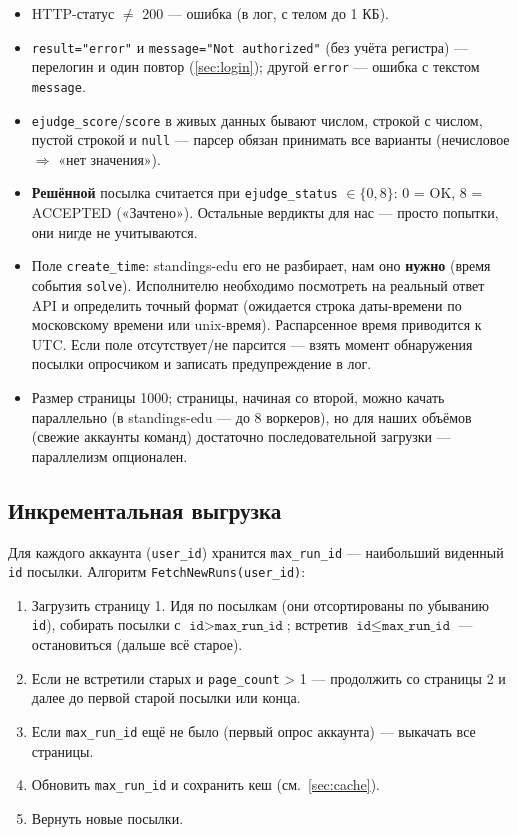 \documentclass[12pt,a4paper]{article}
\newcommand{\field}[1]{\texttt{#1}}
\begin{document}
\begin{itemize}[nosep]
  \item HTTP-статус $\ne$ 200 --- ошибка (в лог, с телом до 1 КБ).
  \item \field{result="error"} и \field{message="Not authorized"}
        (без учёта регистра) --- перелогин и один повтор
        (\ref{sec:login}); другой \field{error} --- ошибка с текстом
        \field{message}.
  \item \field{ejudge\_score}/\field{score} в живых данных бывают числом,
        строкой с числом, пустой строкой и \field{null} --- парсер обязан
        принимать все варианты (нечисловое $\Rightarrow$ «нет значения»).
  \item \textbf{Решённой} посылка считается при
        \field{ejudge\_status} $\in \{0, 8\}$: $0$ = OK, $8$ = ACCEPTED
        («Зачтено»). Остальные вердикты для нас --- просто попытки, они
        нигде не учитываются.
  \item Поле \field{create\_time}: standings-edu его не разбирает, нам оно
        \textbf{нужно} (время события \field{solve}). Исполнителю
        необходимо посмотреть на реальный ответ API и определить точный
        формат (ожидается строка даты-времени по московскому времени или
        unix-время). Распарсенное время приводится к UTC. Если поле
        отсутствует/не парсится --- взять момент обнаружения посылки
        опросчиком и записать предупреждение в лог.
  \item Размер страницы 1000; страницы, начиная со второй, можно качать
        параллельно (в standings-edu --- до 8 воркеров), но для наших
        объёмов (свежие аккаунты команд) достаточно последовательной
        загрузки --- параллелизм опционален.
\end{itemize}

\subsection{Инкрементальная выгрузка}

Для каждого аккаунта (\field{user\_id}) хранится \field{max\_run\_id} ---
наибольший виденный \field{id} посылки. Алгоритм
\field{FetchNewRuns(user\_id)}:

\begin{enumerate}[nosep]
  \item Загрузить страницу 1. Идя по посылкам (они отсортированы по убыванию
        \field{id}), собирать посылки с $\field{id} > \field{max\_run\_id}$;
        встретив $\field{id} \le \field{max\_run\_id}$ --- остановиться
        (дальше всё старое).
  \item Если не встретили старых и \field{page\_count} > 1 --- продолжить
        со страницы 2 и далее до первой старой посылки или конца.
  \item Если \field{max\_run\_id} ещё не было (первый опрос аккаунта) ---
        выкачать все страницы.
  \item Обновить \field{max\_run\_id} и сохранить кеш (см.~\ref{sec:cache}).
  \item Вернуть новые посылки.
\end{enumerate}
\end{document}

